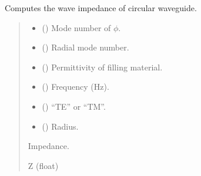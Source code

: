 \documentclass[letterpaper,10pt,english]{sphinxmanual}
\begin{document}

\begin{fulllineitems}
\label{\detokenize{components:components.Z_CWG}}
\pysigstartsignatures
{}
\pysigstopsignatures
\sphinxAtStartPar
Computes the wave impedance of circular waveguide.
\begin{quote}\begin{description}
\begin{itemize}
\item {} 
\sphinxAtStartPar
{} () \textendash{} Mode number of \(\phi\).

\item {} 
\sphinxAtStartPar
{} () \textendash{} Radial mode number.

\item {} 
\sphinxAtStartPar
{} () \textendash{} Permittivity of filling material.

\item {} 
\sphinxAtStartPar
{} () \textendash{} Frequency (Hz).

\item {} 
\sphinxAtStartPar
{} () \textendash{} “TE” or “TM”.

\item {} 
\sphinxAtStartPar
{} () \textendash{} Radius.

\end{itemize}

\sphinxAtStartPar
Impedance.

\sphinxAtStartPar
Z (float)

\end{description}\end{quote}

\end{fulllineitems}
\end{document}
